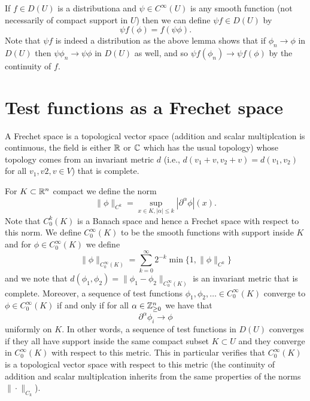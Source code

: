 \documentclass[twoside, a4paper, 10pt]{amsart}
\begin{document}
\begin{mydef} If $f \in D(U)$ is a distributiona and $\psi \in C^{\infty}(U)$ is any smooth function (not necessarily of compact support in $U$) then we can define $\psi f \in D(U)$ by $$\psi f (\phi) = f(\psi \phi).$$ Note that $\psi f$ is indeed a distribution as the above lemma shows that if $\phi_n \to \phi$ in $D(U)$ then $\psi \phi_n \to \psi \phi$ in $D(U)$ as well, and so $\psi f (\phi_n) \to \psi f(\phi)$ by the continuity of $f$.

\end{mydef}
\section{Test functions as a Frechet space}

\begin{mydef} A Frechet space is a topological vector space (addition and scalar multiplcation is continuous, the field is either $\mathbb{R}$ or $\mathbb{C}$ which has the usual topology) whose topology comes from an invariant metric $d$ (i.e., $d(v_1+v, v_2+v) = d(v_1, v_2)$ for all $v_1,v2,v \in V$) that is complete.

\end{mydef}

For $K \subset \mathbb{R}^n$ compact we define the norm $$\| \phi \|_{C^k} = \sup_{x \in K, |\alpha| \leq k} |\partial^{\alpha} \phi| (x).$$ Note that $C_0^k(K)$ is a Banach space and hence a Frechet space with respect to this norm. We define $C_0^{\infty}(K)$ to be the smooth functions with support inside $K$ and for $\phi \in C_0^{\infty}(K)$ we define $$\|\phi\|_{C_0^{\infty}(K)} = \sum_{k=0}^{\infty} 2^{-k} \min\{1, \| \phi \|_{C^k} \} $$ and we note that $d(\phi_1, \phi_2) = \| \phi_1 - \phi_2 \|_{C_0^{\infty}(K)}$ is an invariant metric that is complete. Moreover, a sequence of test functions $\phi_1, \phi_2, \ldots \in C_0^{\infty}(K)$ converge to $\phi \in C_0^{\infty}(K)$ if and only if for all $\alpha \in \mathbb{Z}_{\geq 0}^n$ we have that $$\partial^{\alpha} \phi_i \to \phi$$ uniformly on $K$. In other words, a sequence of test functions in $D(U)$ converges if they all have support inside the same compact subset $K \subset U$ and they converge in $C_0^{\infty}(K)$ with respect to this metric. This in particular verifies that $C_0^{\infty}(K)$ is a topological vector space with respect to this metric (the continuity of addition and scalar multiplcation inherits from the same properties of the norms $\|\cdot \|_{C_k}$).
\end{document}
